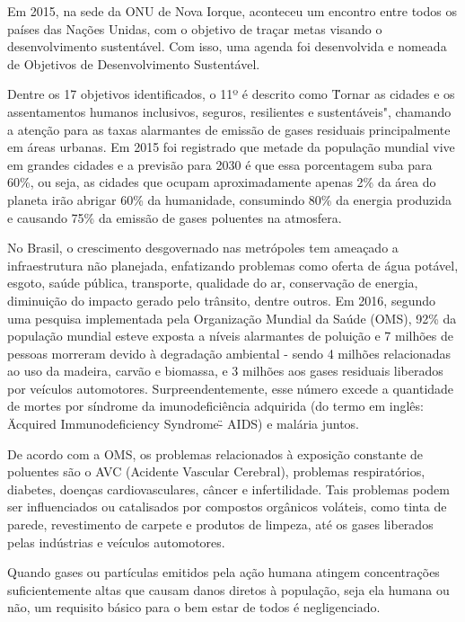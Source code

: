 
Em 2015, na sede da ONU de Nova Iorque, aconteceu um encontro entre todos os países das Nações 
Unidas, com o objetivo de traçar metas visando o desenvolvimento sustentável. Com isso, uma agenda 
foi desenvolvida e nomeada de Objetivos de Desenvolvimento Sustentável. 

Dentre os 17 objetivos identificados, o 11º é descrito como \"Tornar as cidades e os assentamentos 
humanos inclusivos, seguros, resilientes e sustentáveis", chamando a atenção para as taxas 
alarmantes de emissão de gases residuais principalmente em áreas urbanas. Em 2015 foi registrado que 
metade da população mundial vive em grandes cidades e a previsão para 2030 é que essa porcentagem 
suba para 60\%, ou seja, as cidades que ocupam aproximadamente apenas 2\% da área do planeta irão 
abrigar 60\% da humanidade, consumindo 80\% da energia produzida e causando 75\% da emissão de gases 
poluentes na atmosfera. 

No Brasil, o crescimento desgovernado nas metrópoles tem ameaçado a infraestrutura não planejada, 
enfatizando problemas como oferta de água potável, esgoto, saúde pública, transporte, qualidade do 
ar, conservação de energia, diminuição do impacto gerado pelo trânsito, dentre outros. Em 2016, 
segundo uma pesquisa implementada pela Organização Mundial da Saúde (OMS), 92\% da população mundial 
esteve exposta a níveis alarmantes de poluição e 7  milhões de pessoas morreram devido à degradação 
ambiental - sendo 4 milhões relacionadas ao uso da madeira, carvão e biomassa, e 3 milhões aos gases 
residuais liberados por veículos automotores. Surpreendentemente, esse número excede a quantidade de 
mortes por síndrome da imunodeficiência adquirida (do termo em inglês: \"Acquired Immunodeficiency 
Syndrome\" - AIDS) e malária juntos.

De acordo com a OMS, os problemas relacionados à exposição constante de poluentes são o AVC 
(Acidente Vascular Cerebral), problemas respiratórios, diabetes, doenças cardiovasculares, câncer e 
infertilidade. Tais problemas podem ser influenciados ou catalisados por compostos orgânicos 
voláteis, como tinta de parede, revestimento de carpete e produtos de limpeza, até os gases 
liberados pelas indústrias e veículos automotores.

Quando gases ou partículas emitidos pela ação humana atingem concentrações suficientemente altas que 
causam danos diretos à população, seja ela humana ou não, um requisito básico para o bem estar de 
todos é negligenciado.

